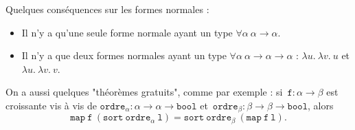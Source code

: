 \documentclass[./main]{subfiles}
\begin{document}
  Quelques conséquences sur les formes normales :
  \begin{itemize}
    \item Il n'y a qu'une seule forme normale ayant un type $\forall \alpha \: \alpha \to \alpha$.
    \item Il n'y a que deux formes normales ayant un type $\forall \alpha \: \alpha \to \alpha \to \alpha$ : $\lambda u.\: \lambda v.\: u$ et $\lambda u.\: \lambda v.\: v$.
  \end{itemize}
  On a aussi quelques "théorèmes gratuits", comme par exemple : si~$\mathtt{f} : \alpha \to \beta$ est croissante vis à vis de $\mathtt{ordre}_\alpha : \alpha \to \alpha \to \mathtt{bool}$ et~$\mathtt{ordre}_\beta : \beta \to \beta \to \mathtt{bool}$, alors 
  \[
  \mathtt{map} \ \mathtt{f} \ (\mathtt{sort}\ \mathtt{ordre}_\alpha\ \mathtt{l}) = \mathtt{sort} \ \mathtt{ordre}_\beta \ (\mathtt{map}\ \mathtt{f}\ \mathtt{l})
  .\] 
\end{document}
